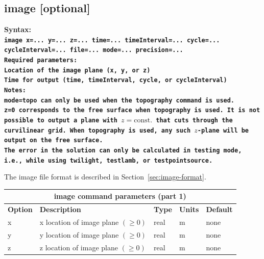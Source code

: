 \documentclass[11pt]{report}
\begin{document}
{\subsection{image [optional]}
\label{keyword:image}
\begin{flushleft}
	\bf Syntax:\\ \tt image x=... y=... z=...
	time=... timeInterval=... cycle=... cycleInterval=... file=... mode=... precision=...\\ \bf Required
	parameters:\\ \rm Location of the image plane (x, y, or z) \\ Time for output (time, timeInterval,
	cycle, or cycleInterval)\\ \bf Notes: \\ \rm \verb+mode=topo+ can only be used when the
	\verb+topography+ command is used.\\ \verb+z=0+ corresponds to the free surface when
	\verb+topography+ is used. It is not possible to output a plane with $z=\mbox{const.}$ that cuts
	through the curvilinear grid. When \verb+topography+ is used, any such $z$-plane will be output on
	the free surface. \\ The error in the solution can only be calculated in testing mode, i.e., while
	using \verb+twilight+, \verb+testlamb+, or \verb+testpointsource+.
\end{flushleft}
%
The image file format is described in Section~\ref{sec:image-format}.
%
\begin{center}
	\begin{tabular}{|l|p{8cm}|l|l|l|} \hline
		\multicolumn{5}{|c|}{\bf image command parameters (part 1)}                                 \\ \hline
		\bf{Option} & \bf{Description}                      & \bf{Type} & \bf{Units} & \bf{Default} \\
		\hline \hline
		x           & x location of image plane  $(\geq 0)$ & real      & m          & none         \\ \hline
		y           & y location of image plane  $(\geq 0)$ & real      & m          & none         \\ \hline
		z           & z location of image plane  $(\geq 0)$ & real      & m          & none         \\ \hline
	\end{tabular}
\end{center}
\begin{center}

\end{center}}
\end{document}
